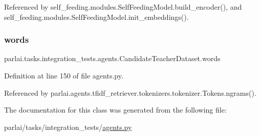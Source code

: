 Referenced by self\+\_\+feeding.\+modules.\+Self\+Feeding\+Model.\+build\+\_\+encoder(), and self\+\_\+feeding.\+modules.\+Self\+Feeding\+Model.\+init\+\_\+embeddings().

\mbox{\label{classparlai_1_1tasks_1_1integration__tests_1_1agents_1_1CandidateTeacherDataset_a4fa5d42ab75aede531e793b548f601ce}} 
\subsubsection{\texorpdfstring{words}{words}}
{\footnotesize\ttfamily parlai.\+tasks.\+integration\+\_\+tests.\+agents.\+Candidate\+Teacher\+Dataset.\+words}



Definition at line 150 of file agents.\+py.



Referenced by parlai.\+agents.\+tfidf\+\_\+retriever.\+tokenizers.\+tokenizer.\+Tokens.\+ngrams().



The documentation for this class was generated from the following file\+:\begin{DoxyCompactItemize}
\item 
parlai/tasks/integration\+\_\+tests/\hyperlink{parlai_2tasks_2integration__tests_2agents_8py}{agents.\+py}\end{DoxyCompactItemize}

